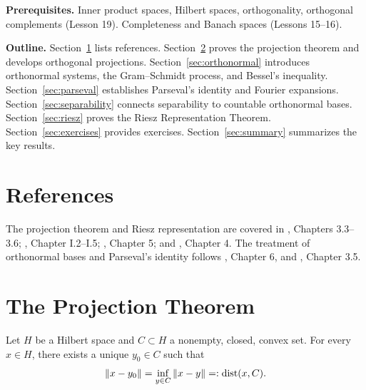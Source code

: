 \documentclass[11pt,a4paper]{article}
\begin{document}
\medskip
\noindent\textbf{Prerequisites.} Inner product spaces, Hilbert spaces,
orthogonality, orthogonal complements (Lesson 19). Completeness and
Banach spaces (Lessons 15--16).

\medskip
\noindent\textbf{Outline.}
Section~\ref{sec:references} lists references.
Section~\ref{sec:projection} proves the projection theorem and develops
orthogonal projections.
Section~\ref{sec:orthonormal} introduces orthonormal systems, the
Gram--Schmidt process, and Bessel's inequality.
Section~\ref{sec:parseval} establishes Parseval's identity and Fourier
expansions.
Section~\ref{sec:separability} connects separability to countable
orthonormal bases.
Section~\ref{sec:riesz} proves the Riesz Representation Theorem.
Section~\ref{sec:exercises} provides exercises.
Section~\ref{sec:summary} summarizes the key results.


\section{References}
\label{sec:references}

The projection theorem and Riesz representation are covered in
\citet{kreyszig1989}, Chapters 3.3--3.6;
\citet{conway1990}, Chapter I.2--I.5;
\citet{brezis2011}, Chapter 5;
and \citet{rudin1991}, Chapter 4.
The treatment of orthonormal bases and Parseval's identity follows
\citet{lax2002}, Chapter 6, and \citet{kreyszig1989}, Chapter 3.5.


\section{The Projection Theorem}
\label{sec:projection}

\begin{theorem}
\label{thm:best-approx}
Let $H$ be a Hilbert space and $C \subset H$ a nonempty, closed, convex
set. For every $x \in H$, there exists a unique $y_0 \in C$ such that
\[
    \|x - y_0\| = \inf_{y \in C} \|x - y\| =: \operatorname{dist}(x, C).
\]
\end{theorem}
\end{document}
